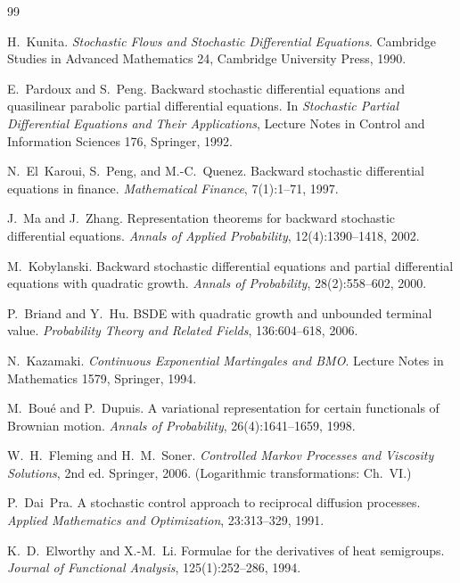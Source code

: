 \documentclass[11pt]{article}
\theoremstyle{definition}
\theoremstyle{remark}
\begin{document}
\begin{thebibliography}{99}

H.~Kunita.
\newblock \emph{Stochastic Flows and Stochastic Differential Equations}.
\newblock Cambridge Studies in Advanced Mathematics 24, Cambridge University Press, 1990.

E.~Pardoux and S.~Peng.
\newblock Backward stochastic differential equations and quasilinear parabolic partial
differential equations.
\newblock In \emph{Stochastic Partial Differential Equations and Their Applications},
Lecture Notes in Control and Information Sciences 176, Springer, 1992.

N.~El~Karoui, S.~Peng, and M.-C.~Quenez.
\newblock Backward stochastic differential equations in finance.
\newblock \emph{Mathematical Finance}, 7(1):1--71, 1997.

J.~Ma and J.~Zhang.
\newblock Representation theorems for backward stochastic differential equations.
\newblock \emph{Annals of Applied Probability}, 12(4):1390--1418, 2002.

M.~Kobylanski.
\newblock Backward stochastic differential equations and partial differential equations with
quadratic growth.
\newblock \emph{Annals of Probability}, 28(2):558--602, 2000.

P.~Briand and Y.~Hu.
\newblock BSDE with quadratic growth and unbounded terminal value.
\newblock \emph{Probability Theory and Related Fields}, 136:604--618, 2006.

N.~Kazamaki.
\newblock \emph{Continuous Exponential Martingales and BMO}.
\newblock Lecture Notes in Mathematics 1579, Springer, 1994.

M.~Bou\'e and P.~Dupuis.
\newblock A variational representation for certain functionals of Brownian motion.
\newblock \emph{Annals of Probability}, 26(4):1641--1659, 1998.

W.~H.~Fleming and H.~M.~Soner.
\newblock \emph{Controlled Markov Processes and Viscosity Solutions}, 2nd ed.
\newblock Springer, 2006. (Logarithmic transformations: Ch.~VI.)

P.~Dai~Pra.
\newblock A stochastic control approach to reciprocal diffusion processes.
\newblock \emph{Applied Mathematics and Optimization}, 23:313--329, 1991.

K.~D.~Elworthy and X.-M.~Li.
\newblock Formulae for the derivatives of heat semigroups.
\newblock \emph{Journal of Functional Analysis}, 125(1):252--286, 1994.


\end{thebibliography}
\end{document}
